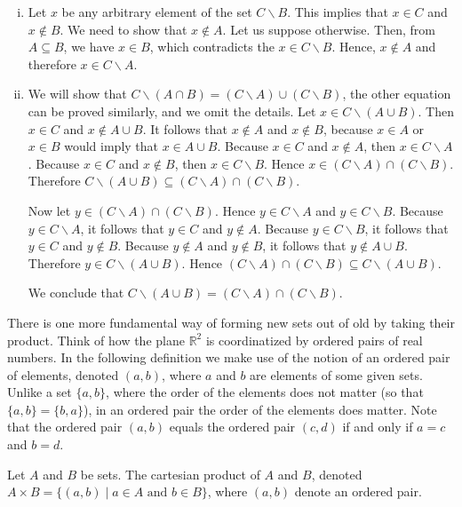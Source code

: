 \documentclass[a4paper,english,12pt]{article}
\newcommand{\Real}{\mathbb{R}}
\begin{document}
\begin{enumerate} [i)]
\item Let $x$ be any arbitrary element of the set $C \backslash B$. This implies that $x \in C$ and 
$x \notin B$. We need to show that $x \notin A$. Let us suppose otherwise. Then, from $A \subseteq B$, we have $x \in B$, which contradicts the $x \in C \backslash B$. Hence, $x \notin A$ and therefore $x \in C \backslash A$.     

\item We will show that $C \backslash (A \cap B) = (C \backslash A) \cup (C \backslash B)$, the other equation can be proved similarly, and we omit the details. Let $x \in C \backslash(A \cup B)$. 
Then $x \in C$ and $x \notin A \cup B$. It follows that $x \notin A$ and $x \notin  B$, because 
$x \in A$ or $x \in B$ would imply that $x \in A \cup B$. Because $x \in C$ and $x \notin A$, then $x \in C \backslash A$. Because $x \in C$ and $x \notin B$, then $x \in C \backslash B$. Hence $x \in (C \backslash A)\cap(C \backslash B)$. Therefore $C \backslash (A \cup B) \subseteq  (C \backslash A)\cap (C \backslash B)$.

Now let $y \in (C \backslash A) \cap (C \backslash B)$. Hence $y \in C \backslash A$ and $y \in C \backslash B$. Because $y \in C \backslash A$, it follows that $y \in C$ and $y \notin A$. Because $y \in C \backslash B$, it follows that $y \in C$ and $y \notin B$.
Because $y \notin A$ and $y \notin B$, it follows that $y \notin A \cup B$. Therefore $y  \in C \backslash (A \cup B)$. Hence $(C \backslash A) \cap (C \backslash B)  \subseteq C \backslash (A \cup B)$.

We conclude that $C \backslash (A \cup B) = (C \backslash A) \cap (C \backslash B)$.
 
\end{enumerate}


There is one more fundamental way of forming new sets out of old by taking their product. Think of how the plane $\Real^{2}$ is coordinatized by ordered pairs of real
numbers. In the following definition we make use of the notion of an ordered pair of elements, denoted $\left(a, b \right)$, where $a$ and $b$ are elements of
some given sets. Unlike a set $\{a, b\}$, where the order of the elements does not matter (so that $\{a, b\} = \{b, a\}$), in an ordered pair the order of the 
elements does matter. Note that the ordered pair $\left(a, b \right)$ equals the ordered pair $\left(c, d \right)$ if and only if $a = c$ and $b = d$. 

\begin{defn}
Let $A$ and $B$ be sets. The cartesian product of $A$ and $B$, denoted 
$A \times B = \{ (a, b) \; | \; a \in A \text{ and } b \in B \}$, 
where $(a, b)$ denote an ordered pair.
\end{defn}
\end{document}
